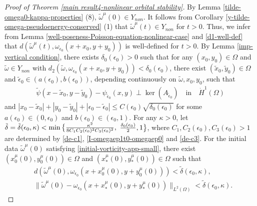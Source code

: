 \documentclass[1 [leqno, 11pt]{amsart}
\numberwithin{equation}{section}
\let\ep=\epsilon
\begin{document}
\begin{CJK*}{GBK}{song}
\begin{proof}[Proof of  Theorem \ref{main result4-nonlinear orbital stability}]
By Lemma \ref{tilde-omega0-kappa-properties} (8), $\tilde \omega^\mu(0)\in Y_{non}$. It follows from Corollary \ref{y-tilde-omega-pseudoenergy-conserved} (1) that $\tilde \omega^\mu(t)\in Y_{non}$ for $t>0$. Thus, we infer from Lemma \ref{well-poseness-Poisson-equation-nonlinear-case} and \eqref{d1-well-def} that $d(\tilde \omega^\mu(t),\omega_{\ep_0}(x+x_0,y+y_0))$ is well-defined for $t>0$.
By Lemma \ref{imp-vertical condition},  there exists $\delta_0(\ep_0)>0$ such that for any  $(x_0,y_0)\in\Omega$ and  $\tilde \omega\in Y_{non}$ with $d_2(\tilde \omega,\omega_{\ep_0}(x+x_0,y+y_0))< \delta_0(\ep_0)$, there exist $(\tilde x_0,\tilde y_0)\in\Omega$ and $\tilde\epsilon_0\in(a(\ep_0),b(\ep_0))$, depending continuously on $\tilde\omega, x_0, y_0$, such that
\begin{align}\label{app-lemma-imp-vertical condition}
\tilde \psi\left(x-\tilde x_0,y-\tilde y_0\right)-\psi_{\tilde\ep_0}(x,y)\perp\ker \left( A_{\tilde\ep_0}\right)\quad \text{in}\quad \dot{H}^1(\Omega)
\end{align}
 and
$
|x_0-\tilde x_0|+|y_0-\tilde y_0|+|\ep_0-\tilde \ep_0|\leq C(\ep_0)\sqrt{\delta_0(\ep_0)}
$
for some $a(\ep_0)\in (0,\ep_0)$ and $b(\ep_0)\in(\ep_0,1)$.
For any $\kappa>0$, let $\tilde\delta=\tilde\delta(\ep_0,\kappa)<\min\big\{{\kappa^2\over8C_1C_2(\ep_0)^2C_3(\ep_0)^2},$ ${\delta_0(\ep_0)\over2},1\big\}$, where $C_1, C_2(\ep_0), C_3(\ep_0)>1$ are  determined by \eqref{de-c1}, \eqref{I-omegaep1t0-omegaep0} and \eqref{de-c3}.
For the initial data $\tilde \omega^\mu(0)$ satisfying
\eqref{initial-vorticity-app-small},
there exist $(x_0^\mu(0),y_0^\mu(0))\in\Omega$ and $(x_*^\mu(0),y_*^\mu(0))\in\Omega$ such that
\begin{align}\label{initial data distance} &d(\tilde \omega^\mu(0),\omega_{\ep_0}(x+x_0^\mu(0),y+y_0^\mu(0)))<\tilde\delta(\ep_0,\kappa),\\
&\|\tilde \omega^\mu(0)-\omega_{\ep_0}(x+x_*^\mu(0),y+y_*^\mu(0))\|_{L^2(\Omega)}<\tilde\delta(\ep_0,\kappa).\label{initial data}\end{align}


\end{proof}
\end{CJK*}
\end{document}
